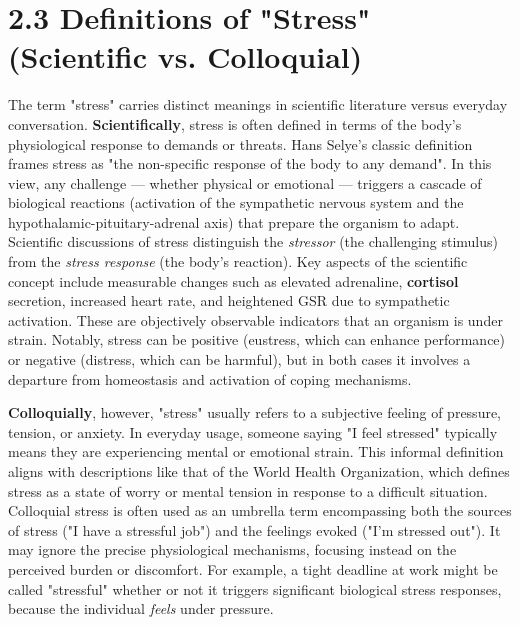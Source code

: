 \section{2.3 Definitions of "Stress" (Scientific vs. Colloquial)}

The term "stress" carries distinct meanings in scientific literature
versus everyday conversation. \textbf{Scientifically}, stress is often
defined in terms of the body's physiological response to demands or
threats. Hans Selye's classic definition frames stress as "the
non-specific response of the body to any
demand"\cite{StressDefinitionHH}.
In this view, any challenge --- whether physical or emotional --- triggers
a cascade of biological reactions (activation of the sympathetic nervous
system and the hypothalamic-pituitary-adrenal axis) that prepare the
organism to adapt. Scientific discussions of stress distinguish the
\textit{stressor} (the challenging stimulus) from the \textit{stress response} (the
body's reaction). Key aspects of the scientific concept include
measurable changes such as elevated adrenaline, \textbf{cortisol} secretion,
increased heart rate, and heightened GSR due to sympathetic
activation\cite{CortisolStressIndicator2020}.
These are objectively observable indicators that an organism is under
strain. Notably, stress can be positive (eustress, which can enhance
performance) or negative (distress, which can be harmful), but in both
cases it involves a departure from homeostasis and activation of coping
mechanisms.

\textbf{Colloquially}, however, "stress" usually refers to a subjective
feeling of pressure, tension, or anxiety. In everyday usage, someone
saying "I feel stressed" typically means they are experiencing mental or
emotional strain. This informal definition aligns with descriptions like
that of the World Health Organization, which defines stress as a state
of worry or mental tension in response to a difficult
situation\cite{WHOStressDefinition}.
Colloquial stress is often used as an umbrella term encompassing both
the sources of stress ("I have a stressful job") and the feelings evoked
("I'm stressed out"). It may ignore the precise physiological
mechanisms, focusing instead on the perceived burden or discomfort. For
example, a tight deadline at work might be called "stressful" whether or
not it triggers significant biological stress responses, because the
individual \textit{feels} under pressure.

